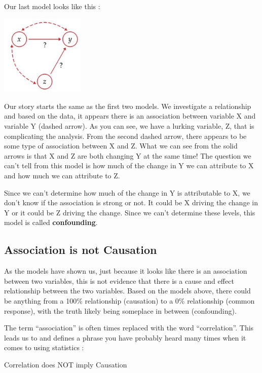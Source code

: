 \documentclass[
  letterpaper,
  DIV=11,
  numbers=noendperiod]{scrreprt}
\begin{document}
Our last model looks like this :

\includegraphics[width=0.3\textwidth,height=\textheight]{./images/IDV_3.jpg}

Our story starts the same as the first two models. We investigate a
relationship and based on the data, it appears there is an association
between variable X and variable Y (dashed arrow). As you can see, we
have a lurking variable, Z, that is complicating the analysis. From the
second dashed arrow, there appears to be some type of association
between X and Z. What we can see from the solid arrows is that X and Z
are both changing Y at the same time! The question we can't tell from
this model is how much of the change in Y we can attribute to X and how
much we can attribute to Z.

Since we can't determine how much of the change in Y is attributable to
X, we don't know if the association is strong or not. It could be X
driving the change in Y or it could be Z driving the change. Since we
can't determine these levels, this model is called \textbf{confounding}.

\subsection*{Association is not
Causation}\label{association-is-not-causation}

As the models have shown us, just because it looks like there is an
association between two variables, this is not evidence that there is a
cause and effect relationship between the two variables. Based on the
models above, there could be anything from a 100\% relationship
(causation) to a 0\% relationship (common response), with the truth
likely being someplace in between (confounding).

The term ``association'' is often times replaced with the word
``correlation''. This leads us to and defines a phrase you have probably
heard many times when it comes to using statistics :

\begin{tcolorbox}[enhanced jigsaw, breakable, arc=.35mm, leftrule=.75mm, toprule=.15mm, titlerule=0mm, coltitle=black, colframe=quarto-callout-important-color-frame, left=2mm, opacitybacktitle=0.6, rightrule=.15mm, bottomrule=.15mm, colback=white, toptitle=1mm, opacityback=0, title=\textcolor{quarto-callout-important-color}{\faExclamation}\hspace{0.5em}{Important}, bottomtitle=1mm, colbacktitle=quarto-callout-important-color!10!white]

Correlation does NOT imply Causation

\end{tcolorbox}
\end{document}
